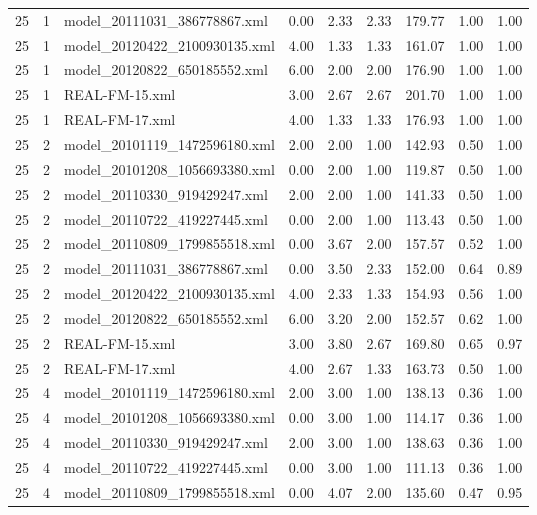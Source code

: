 \begin{table}[ht]
\begin{tabular}{rrlrrrrrr}
   25 &   1 & model\_20111031\_386778867.xml & 0.00 & 2.33 & 2.33 & 179.77 & 1.00 & 1.00 \\ 
   25 &   1 & model\_20120422\_2100930135.xml & 4.00 & 1.33 & 1.33 & 161.07 & 1.00 & 1.00 \\ 
   25 &   1 & model\_20120822\_650185552.xml & 6.00 & 2.00 & 2.00 & 176.90 & 1.00 & 1.00 \\ 
   25 &   1 & REAL-FM-15.xml & 3.00 & 2.67 & 2.67 & 201.70 & 1.00 & 1.00 \\ 
   25 &   1 & REAL-FM-17.xml & 4.00 & 1.33 & 1.33 & 176.93 & 1.00 & 1.00 \\ 
   25 &   2 & model\_20101119\_1472596180.xml & 2.00 & 2.00 & 1.00 & 142.93 & 0.50 & 1.00 \\ 
   25 &   2 & model\_20101208\_1056693380.xml & 0.00 & 2.00 & 1.00 & 119.87 & 0.50 & 1.00 \\ 
   25 &   2 & model\_20110330\_919429247.xml & 2.00 & 2.00 & 1.00 & 141.33 & 0.50 & 1.00 \\ 
   25 &   2 & model\_20110722\_419227445.xml & 0.00 & 2.00 & 1.00 & 113.43 & 0.50 & 1.00 \\ 
   25 &   2 & model\_20110809\_1799855518.xml & 0.00 & 3.67 & 2.00 & 157.57 & 0.52 & 1.00 \\ 
   25 &   2 & model\_20111031\_386778867.xml & 0.00 & 3.50 & 2.33 & 152.00 & 0.64 & 0.89 \\ 
   25 &   2 & model\_20120422\_2100930135.xml & 4.00 & 2.33 & 1.33 & 154.93 & 0.56 & 1.00 \\ 
   25 &   2 & model\_20120822\_650185552.xml & 6.00 & 3.20 & 2.00 & 152.57 & 0.62 & 1.00 \\ 
   25 &   2 & REAL-FM-15.xml & 3.00 & 3.80 & 2.67 & 169.80 & 0.65 & 0.97 \\ 
   25 &   2 & REAL-FM-17.xml & 4.00 & 2.67 & 1.33 & 163.73 & 0.50 & 1.00 \\ 
   25 &   4 & model\_20101119\_1472596180.xml & 2.00 & 3.00 & 1.00 & 138.13 & 0.36 & 1.00 \\ 
   25 &   4 & model\_20101208\_1056693380.xml & 0.00 & 3.00 & 1.00 & 114.17 & 0.36 & 1.00 \\ 
   25 &   4 & model\_20110330\_919429247.xml & 2.00 & 3.00 & 1.00 & 138.63 & 0.36 & 1.00 \\ 
   25 &   4 & model\_20110722\_419227445.xml & 0.00 & 3.00 & 1.00 & 111.13 & 0.36 & 1.00 \\ 
   25 &   4 & model\_20110809\_1799855518.xml & 0.00 & 4.07 & 2.00 & 135.60 & 0.47 & 0.95 \\ 

\end{tabular}
\end{table}

